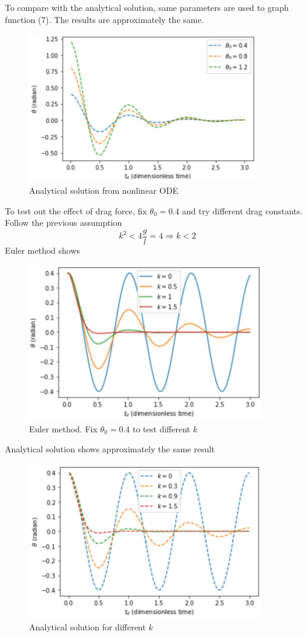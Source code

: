 \documentclass{article}
\begin{document}
To compare with the analytical solution, same parameters are used to graph function (7). The results are approximately the same.
\begin{figure}[H]
\includegraphics[width=3.9in]{DragAnalyticalDifferentTheta0.jpg}
\caption{Analytical solution from nonlinear ODE}
\end{figure}
\noindent To test out the effect of drag force, fix $\theta_0=0.4$ and try different drag constants. Follow the previous assumption \[k^2<4\frac{g}{l}=4 \Rightarrow k<2\]
Euler method shows
\begin{figure}[H]
\includegraphics[width=4in]{DragEulerDifferentK.jpg}
\caption{Euler method. Fix $\theta_0=0.4$ to test different $k$}
\end{figure}
\noindent Analytical solution shows approximately the same result
\begin{figure}[H]
\includegraphics[width=4in]{DragAnalyticalDifferentK.jpg}
\caption{Analytical solution for different $k$}
\end{figure}
\end{document}
